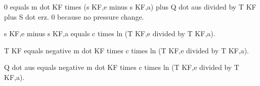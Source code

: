 0 equals m dot KF times (s KF,e minus s KF,a) plus Q dot aus divided by T KF plus S dot erz.  
0 because no pressure change.  

s KF,e minus s KF,a equals c times ln (T KF,e divided by T KF,a).  

T KF equals negative m dot KF times c times ln (T KF,e divided by T KF,a).  

Q dot aus equals negative m dot KF times c times ln (T KF,e divided by T KF,a).